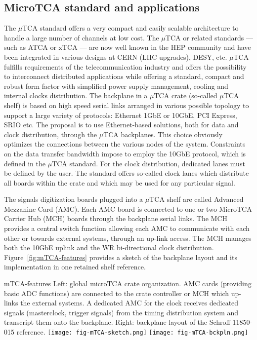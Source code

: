 \subsection{MicroTCA standard and applications}

The $\mu$TCA standard offers a very compact and easily scalable architecture to handle a large number of channels at low cost. The
$\mu$TCA or related standards --- such as ATCA or xTCA --- are now well known in the HEP community and have been integrated in various designs
at CERN (LHC upgrades), DESY, etc.  $\mu$TCA fulfills requirements of the telecommunication industry and offers the possibility to
interconnect distributed applications while offering a standard, compact and robust form factor with simplified power supply
management, cooling and internal clocks distribution. The backplane in a $\mu$TCA crate (so-called $\mu$TCA shelf) is based on high speed
serial links arranged in various possible topology to support a large variety of protocols: Ethernet 1GbE or 10GbE, PCI Express, SRIO
etc. The proposal is to use Ethernet-based solutions, both for data and clock distribution, through the $\mu$TCA backplanes. This choice
obviously optimizes the connections between the various nodes of the system. Constraints on the data transfer bandwidth impose to employ
the 10GbE protocol, which is defined in the $\mu$TCA standard. For the clock distribution, dedicated lanes must be defined by the user. The
standard offers so-called clock lanes which distribute all boards within the crate and which may be used for any particular signal.

The signals digitization boards plugged into a $\mu$TCA shelf are called Advanced Mezzanine Card (AMC)\cite{picmg-2006}. Each AMC board
is connected to one or two MicroTCA Carrier Hub (MCH) boards through the backplane serial links. The MCH provides a central switch function
allowing each AMC to communicate with each other or towards external systems, through an up-link access. The MCH manages both the 10GbE
uplink and the WR bi-directional clock distribution. Figure~\ref{fig:mTCA-features} provides a sketch of the backplane
layout and its implementation in one retained shelf reference.

\begin{cdrfigure}{mTCA-features}
{\small Left: global microTCA crate organization. AMC cards 
(providing basic ADC functions) are connected to the crate 
controller or MCH which up-links the external systems. A dedicated 
AMC for the clock receives dedicated signals (masterclock, trigger 
signals) from the timing distribution system and transcript them onto 
the backplane. Right: backplane layout of the Schroff 11850-015 reference.}
\texttt{[image: fig-mTCA-sketch.png]}\hfill
\texttt{[image: fig-mTCA-bckpln.png]}
\end{cdrfigure}


